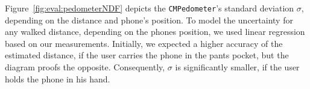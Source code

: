 Figure~\ref{fig:eval:pedometerNDF} depicts the \texttt{CMPedometer}'s standard deviation $\sigma$, depending on the distance and phone's position. To model the uncertainty for any walked distance, depending on the phones position, we used linear regression based on our measurements. Initially, we expected a higher accuracy of the estimated distance, if the user carries the phone in the pants pocket, but the diagram proofs the opposite. Consequently, $\sigma$ is significantly smaller, if the user holds the phone in his hand.



